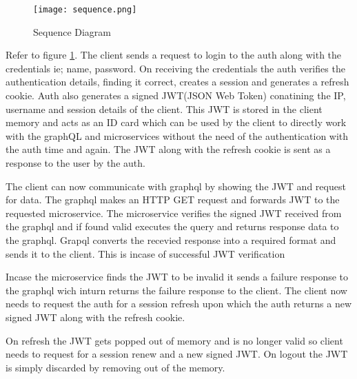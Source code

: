 \begin{figure}[h!]
    \begin{center}
        \texttt{[image: sequence.png]}
    \end{center}
    \caption{Sequence Diagram}
    \label{fig:sequence}
\end{figure}

Refer to figure \ref{fig:sequence}. The client sends a request to login to the auth along with the credentials ie; name, password.
On receiving the credentials the auth verifies the authentication details, finding it correct, creates a session and generates a refresh cookie.
Auth also generates a signed JWT(JSON Web Token) conatining the IP, username and session details of the client.
This JWT is stored in the client memory and acts as an ID card which can be used by the client to directly work with the graphQL and microservices without the need of the authentication with the auth time and again.
The JWT along with the refresh cookie is sent as a response to the user by the auth.

The client can now communicate with graphql by showing the JWT and request for data.
The graphql makes an HTTP GET request and forwards JWT to the requested microservice.
The microservice verifies the signed JWT received from the graphql and if found valid executes the query and returns response data to the graphql.
Grapql converts the recevied response into a required format and sends it to the client.
This is incase of successful JWT verification

Incase the microservice finds the JWT to be invalid it sends a failure response to the graphql wich inturn returns the failure response to the client.
The client now needs to request the auth for a session refresh upon which the auth returns a new signed JWT along with the refresh cookie.

On refresh the JWT gets popped out of memory and is no longer valid so client needs to request for a session renew and a new signed JWT.
On logout the JWT is simply discarded by removing out of the memory. 

